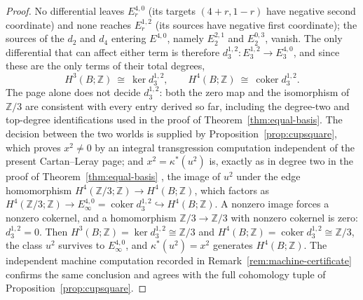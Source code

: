 \documentclass[11pt,a4paper]{article}
\begin{document}
\begin{proof}
No differential leaves $E_r^{4,0}$ (its targets $(4+r,1-r)$ have negative
second coordinate) and none reaches $E_r^{1,2}$ (its sources have negative
first coordinate); the sources of the $d_2$ and $d_4$ entering $E^{4,0}$,
namely $E_2^{2,1}$ and $E_2^{0,3}$, vanish. The only differential that can
affect either term is therefore $d_3^{1,2}\colon E_3^{1,2}\to E_3^{4,0}$, and
since these are the only terms of their total degrees,
\[
H^3(B;\mathbb Z)\ \cong\ \ker d_3^{1,2},
\qquad
H^4(B;\mathbb Z)\ \cong\ \operatorname{coker} d_3^{1,2}.
\]
The page alone does not decide $d_3^{1,2}$: both the zero map and the
isomorphism of $\mathbb Z/3$ are consistent with every entry derived so far,
including the degree-two and top-degree identifications used in the proof of
Theorem~\ref{thm:equal-basis}. The decision between the two worlds is
supplied by Proposition~\ref{prop:cupsquare}, which proves $x^2\ne0$ by an
integral transgression computation independent of the present Cartan--Leray
page; and $x^2=\kappa^*(u^2)$ is, exactly as in degree two in the
proof of Theorem~\ref{thm:equal-basis} \cite{Brown1982}, the image of $u^2$
under the edge homomorphism $H^4(\mathbb Z/3;\mathbb Z)\to H^4(B;\mathbb Z)$,
which factors as $H^4(\mathbb Z/3;\mathbb Z)\to E_\infty^{4,0}=
\operatorname{coker}d_3^{1,2}\hookrightarrow H^4(B;\mathbb Z)$. A nonzero
image forces a nonzero cokernel, and a homomorphism
$\mathbb Z/3\to\mathbb Z/3$ with nonzero cokernel is zero: $d_3^{1,2}=0$.
Then $H^3(B;\mathbb Z)=\ker d_3^{1,2}\cong\mathbb Z/3$ and
$H^4(B;\mathbb Z)=\operatorname{coker}d_3^{1,2}\cong\mathbb Z/3$, the class
$u^2$ survives to $E_\infty^{4,0}$, and $\kappa^*(u^2)=x^2$ generates
$H^4(B;\mathbb Z)$. The independent machine computation recorded in
Remark~\ref{rem:machine-certificate} confirms the same conclusion and agrees
with the full cohomology tuple of Proposition~\ref{prop:cupsquare}.
\end{proof}
\end{document}
